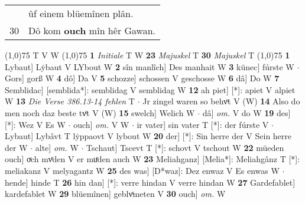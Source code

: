 \documentclass[8pt,a4paper,notitlepage]{article}
\begin{document}
\begin{table}[ht]
\begin{minipage}[t]{0.5\linewidth}
\begin{tabular}{rl}
 & ûf einem blüemînen plân.\\ 
30 & Dô kom \textbf{ouch} mîn hêr Gawan.\\ 
\end{tabular}
\scriptsize
\line(1,0){75} \newline
T V W \newline
\line(1,0){75} \newline
\textbf{1} \textit{Initiale} T W  \textbf{23} \textit{Majuskel} T  \textbf{30} \textit{Majuskel} T  \newline
\line(1,0){75} \newline
\textbf{1} Lybaut] Lẏbaut V LYbout W \textbf{2} sîn manlîch] Des manhait W \textbf{3} künec] fúrste W  $\cdot$ Gors] gorß W \textbf{4} dô] Da V \textbf{5} schozze] schossen V geschosse W \textbf{6} dâ] Do W \textbf{7} Semblidac] [semblida*]: semblidag V semblidag W \textbf{12} ah piet] [*]: apiet V alpiet W \textbf{13} \textit{Die Verse 386.13-14 fehlen} T   $\cdot$ Jr zingel waren so behvͦt V (W) \textbf{14} Also do men noch daz beste tvͦt V (W) \textbf{15} swelch] Welich W  $\cdot$ dâ] \textit{om.} V do W \textbf{19} des] [*]: Wez V Es W  $\cdot$ ouch] \textit{om.} V W  $\cdot$ ir vater] sin vater T [*]: der fúrste V  $\cdot$ Lybaut] Lybâvt T lẏppaovt V lybout W \textbf{20} der] [*]: Sin herre der V Sein herre der W  $\cdot$ alte] \textit{om.} W  $\cdot$ Tschaut] Tscevt T [*]: schovt V tschout W \textbf{22} müeden ouch] oͮch mvͤden V er muͤden auch W \textbf{23} Meliahganz] [Melia*]: Meliahgânz T [*]: meliakanz V melyagantz W \textbf{25} des was] [D*waz]: Dez enwaz V Es enwas W  $\cdot$ hende] hinde T \textbf{26} hin dan] [*]: verre hindan V verre hindan W \textbf{27} Gardefablet] kardefablet W \textbf{29} blüemînen] geblvͤmeten V \textbf{30} ouch] \textit{om.} W \newline
\end{minipage}
\end{table}
\end{document}
